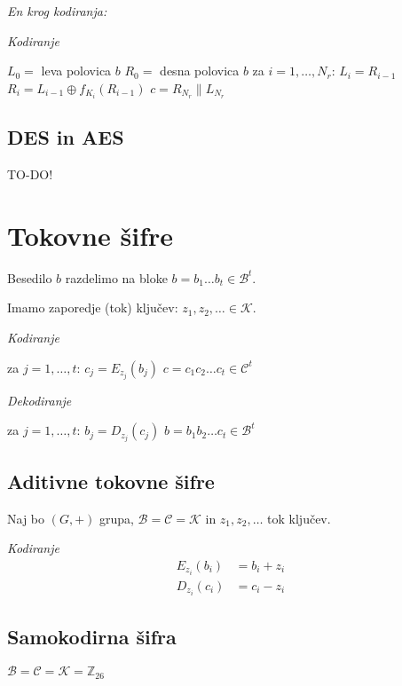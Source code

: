 \begin{multicols}{5}
\textit{En krog kodiranja:}
\begin{center}
\end{center}

\textit{Kodiranje}
\begin{koda}
$L_0 = $ leva polovica $b$
$R_0 = $ desna polovica $b$
za $i = 1, \dots, N_r$:
	$L_i = R_{i-1}$
	$R_i = L_{i-1} \oplus f_{K_i}(R_{i-1})$
$c = R_{N_r} \| L_{N_r}$
\end{koda}

\subsection*{DES in AES}
TO-DO!

\section*{Tokovne šifre}
Besedilo $b$ razdelimo na bloke $b = b_1 \dots b_t \in \mathcal{B}^t$.

Imamo zaporedje (tok) ključev: $z_1, z_2, \dots \in \mathcal{K}$.

\textit{Kodiranje}
\begin{koda}
za $j = 1, \dots, t$:
	$c_j = E_{z_j}(b_j)$
$c = c_1 c_2 \dots c_t \in \mathcal{C}^t$
\end{koda}

\textit{Dekodiranje}
\begin{koda}
za $j = 1, \dots, t$:
	$b_j = D_{z_j}(c_j)$
$b = b_1 b_2 \dots c_t \in \mathcal{B}^t$
\end{koda}

\subsection*{Aditivne tokovne šifre}
Naj bo $(G, +)$ grupa, $\mathcal{B} = \mathcal{C} = \mathcal{K}$ in $z_1, z_2, \dots$ tok ključev.

\textit{Kodiranje}
\begin{align*}
E_{z_i} (b_i) &= b_i + z_i \\	
D_{z_i} (c_i) &= c_i - z_i
\end{align*}

\subsection*{Samokodirna šifra}
$\mathcal{B} = \mathcal{C} = \mathcal{K} = \mathbb{Z}_{26}$


\end{multicols}
